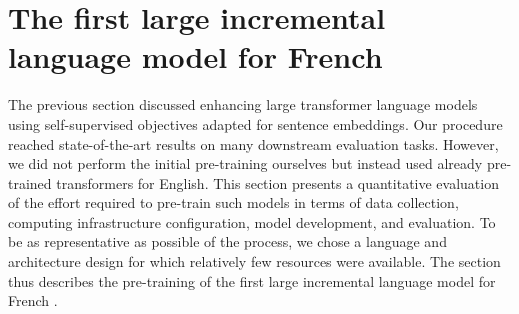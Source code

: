 \setchapterpreamble[u]{\margintoc}
\chapter{The first large incremental language model for French}



The previous section discussed enhancing large transformer language models using self-supervised objectives adapted for sentence embeddings. Our procedure reached state-of-the-art results on many downstream evaluation tasks. However, we did not perform the initial pre-training ourselves but instead used already pre-trained transformers for English. This section presents a quantitative evaluation of the effort required to pre-train such models in terms of data collection, computing infrastructure configuration, model development, and evaluation. To be as representative as possible of the process, we chose a language and architecture design for which relatively few resources
were available. The section thus describes the pre-training of the first large incremental language model for French \parencite{simoulin_2021c}.


